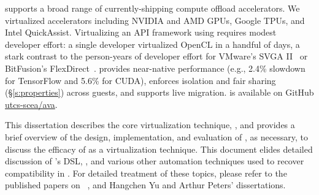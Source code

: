 \AvA supports a broad range of currently-shipping compute offload
accelerators. We virtualized \numaccelerators accelerators including NVIDIA
and AMD GPUs, Google TPUs, and Intel QuickAssist. Virtualizing an API
framework using \AvA requires modest developer effort: a single developer
virtualized OpenCL in a handful of days, a stark contrast to the person-years
of developer effort for VMware's SVGA II~\cite{dowty2009gpu} or BitFusion's
FlexDirect~\cite{bitfusion}. \AvA provides near-native performance
(e.g., 2.4\% slowdown for TensorFlow and 5.6\% for CUDA), enforces isolation
and fair sharing (\S\ref{s:properties}) across guests, and supports live
migration. \AvA is available on GitHub \mbox{\href{https://github.com/utcs-scea/ava}{utcs-scea/ava}}.

This dissertation describes the core virtualization technique, \hira, and
provides a brief overview of the design, implementation, and evaluation of
\AvA, as necessary, to discuss the efficacy of \hira as a virtualization
technique. This document elides detailed discussion of \AvA's DSL, \lapis, and
various other automation techniques used to recover compatibility in \AvA. For
detailed treatment of these topics, please refer to the published papers on
\AvA~\cite{ava-hotos,ava-asplos}, and Hangchen Yu and Arthur Peters'
dissertations.